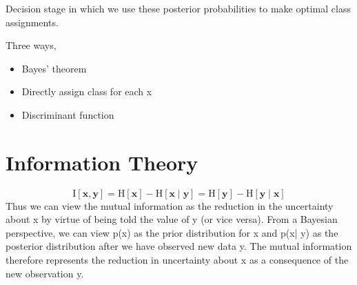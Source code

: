 \documentclass[11pt,en,cite=authoryear]{elegantpaper}
\begin{document}
Decision stage in which we use these posterior probabilities to make optimal class assignments.

Three ways,
\begin{itemize}
    \item Bayes' theorem
    \item Directly assign class for each x
    \item Discriminant function
\end{itemize}

\section{Information Theory}
$$
\mathrm{I}[\mathbf{x}, \mathbf{y}]=\mathrm{H}[\mathbf{x}]-\mathrm{H}[\mathbf{x} \mid \mathbf{y}]=\mathrm{H}[\mathbf{y}]-\mathrm{H}[\mathbf{y} \mid \mathbf{x}]
$$
Thus we can view the mutual information as the reduction in the uncertainty about x by virtue of being told the value of y (or vice versa). From a Bayesian perspective, we can view p(x) as the prior distribution for x and p(x| y) as the posterior distribution after we have observed new data y. The mutual information therefore represents the reduction in uncertainty about x as a consequence of the new observation y.




\appendix
\addappheadtotoc
\end{document}
